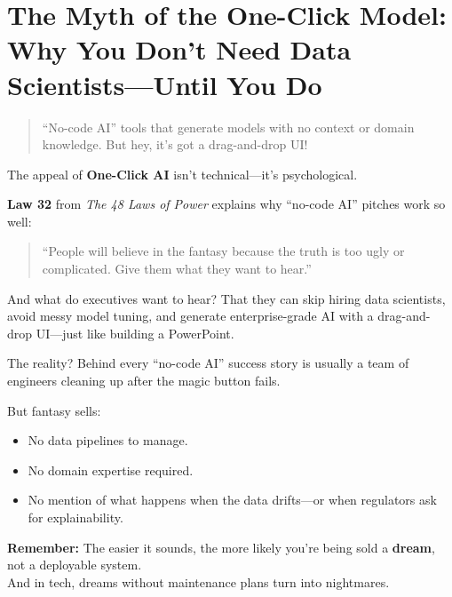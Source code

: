 \section{The Myth of the One-Click Model: Why You Don’t Need Data Scientists—Until You Do}

\begin{quote}
“No-code AI” tools that generate models with no context or domain knowledge. But hey, it’s got a drag-and-drop UI!
\end{quote}

  The appeal of \textbf{One-Click AI} isn’t technical—it’s psychological.
  
  \medskip
  
  \textbf{Law 32} from \textit{The 48 Laws of Power} explains why ``no-code AI'' pitches work so well:
  \begin{quote}
  ``People will believe in the fantasy because the truth is too ugly or complicated. Give them what they want to hear.''
  \end{quote}
  
  \medskip
  
  And what do executives want to hear? That they can skip hiring data scientists, avoid messy model tuning, and generate enterprise-grade AI with a drag-and-drop UI—just like building a PowerPoint.
  
  \medskip
  
  The reality? Behind every ``no-code AI'' success story is usually a team of engineers cleaning up after the magic button fails.
  
  \medskip
  
  But fantasy sells:
  \begin{itemize}
    \item No data pipelines to manage.
    \item No domain expertise required.
    \item No mention of what happens when the data drifts—or when regulators ask for explainability.
  \end{itemize}
  
  \medskip
  
  \textbf{Remember:} The easier it sounds, the more likely you’re being sold a \textbf{dream}, not a deployable system. \\
  And in tech, dreams without maintenance plans turn into nightmares.
  
  


